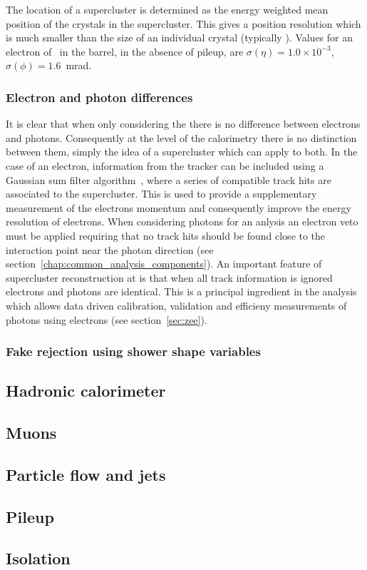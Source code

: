 The location of a supercluster is determined as the energy weighted mean position of the crystals in the supercluster. This gives a position resolution which is much smaller than the size of an individual crystal (typically ). Values for an electron of ~\GeV in the \ECAL barrel, in the absence of pileup, are $\sigma(\eta)=1.0\times10^{-3}$, $\sigma(\phi)=1.6$~mrad.

\subsubsection{Electron and photon differences}

It is clear that when only considering the \ECAL there is no difference between electrons and photons. Consequently at the level of the calorimetry there is no distinction between them, simply the idea of a supercluster which can apply to both. In the case of an electron, information from the tracker can be included using a Gaussian sum filter algorithm~\cite{tracker_electron_reco}, where a series of compatible track hits are associated to the supercluster. This is used to provide a supplementary measurement of the electrons momentum and consequently improve the energy resolution of electrons. When considering photons for an anlysis an electron veto must be applied requiring that no track hits should be found close to the interaction point near the photon direction (see section~\ref{chap:common_analysis_components}). An important feature of supercluster reconstruction at \CMS is that when all track information is ignored electrons and photons are identical. This is a principal ingredient in the \Hgg analysis which allows data driven calibration, validation and efficieny measurements of photons using electrons (see section~\ref{sec:zee}).

\subsubsection{Fake rejection using shower shape variables}

\subsection{Hadronic calorimeter}
\label{sec:hcal}

\subsection{Muons}
\label{sec:muons}

\subsection{Particle flow and jets}
\label{sec:pflow_jets}

\subsection{Pileup}
\label{sec:pileup}

\subsection{Isolation}
\label{sec:iso}






